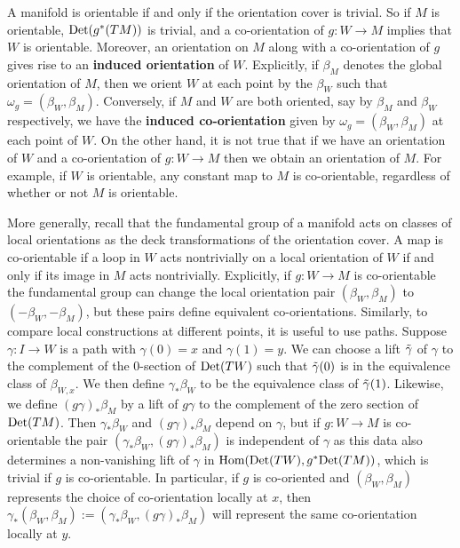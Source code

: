 A manifold is orientable if and only if the orientation  cover is trivial.  So if $M$ is orientable, ${\rm Det}(g^*(TM))$ is trivial, and  a co-orientation 
of $g: W \to M$ implies that $W$ is orientable.  Moreover, an orientation on $M$ along with a co-orientation of $g$ gives rise to an \textbf{induced orientation} of $W$. Explicitly, if $\beta_M$ denotes the global orientation of $M$, then we orient $W$ at each point by the $\beta_W$ such that $\omega_g=(\beta_W,\beta_M)$. Conversely, if $M$ and $W$ are both oriented, say by $\beta_M$ and $\beta_W$ respectively, we have the \textbf{induced co-orientation} given by $\omega_g=(\beta_W,\beta_M)$ at each point of $W$. 
On the other hand, it is not true that if we have an orientation of $W$ and a co-orientation of $g:W\to M$ then we obtain an orientation of $M$. For example, if $W$ is orientable, any constant map to $M$ is co-orientable, regardless of whether or not $M$ is orientable.    

More generally, recall that the fundamental group
of a manifold acts on classes of local orientations as the deck transformations  of the orientation cover.
A map is co-orientable if a loop in $W$ acts nontrivially on a local orientation of $W$ if and only if
its image in $M$ acts nontrivially.  Explicitly, if $g:W\to M$ is co-orientable  the fundamental group can change the local orientation pair
$(\beta_W, \beta_M)$ to $(-\beta_W, -\beta_M)$, but these pairs define equivalent co-orientations.
Similarly, to compare local constructions at different points, it is useful to use paths. Suppose $\gamma:I\to W$ is a path with $\gamma(0)=x$ and $\gamma(1)=y$. We can choose a lift $\tilde \gamma$ of $\gamma$ to the complement of the $0$-section of ${\rm Det}(TW)$ such that $\tilde \gamma(0)$ is in the equivalence class of $\beta_{W,x}$. We then define $\gamma_*\beta_{W}$ to be the equivalence class of $\tilde \gamma(1)$. Likewise, we define $(g\gamma)_*\beta_M$ by a lift of $g\gamma$ to the complement of the zero section of ${\rm Det}(TM)$. Then  $\gamma_*\beta_{W}$ and $(g\gamma)_*\beta_M$ depend on $\gamma$, but if $g:W\to M$ is co-orientable the pair $(\gamma_*\beta_{W}, (g\gamma)_*\beta_M)$ is independent of $\gamma$ as this data also determines a non-vanishing lift of $\gamma$ in $\textup{Hom}({\rm Det}(TW),g^*{\rm Det}(TM))$, which is trivial if $g$ is co-orientable. In particular, if  $g$ is co-oriented and $(\beta_{W}, \beta_M)$ represents the choice of co-orientation locally at $x$, then $\gamma_*(\beta_W,\beta_M):=(\gamma_*\beta_{W}, (g\gamma)_*\beta_M)$ will represent the same co-orientation locally at $y$. 


